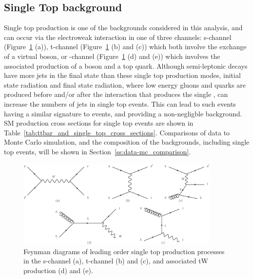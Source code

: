\subsection{Single Top background}
\label{ss:single_top}
Single top production is one of the backgrounds considered in this analysis, and can occur via the electroweak
interaction in one of three channels: s-channel (Figure~\ref{fig:single_top_production} (a)), t-channel
(Figure~\ref{fig:single_top_production} (b) and (c)) which both involve the exchange of a virtual \W boson, or
\tW-channel (Figure~\ref{fig:single_top_production} (d) and (e)) which involves the associated production of a
\W boson and a top quark. Although semi-leptonic \ttbar decays have more jets in the final state than these
single top production modes, initial state radiation and final state radiation, where low energy gluons and
quarks are produced before and/or after the interaction that produces the single \tquark, can increase the
numbers of jets in single top events. This can lead to such events having a similar signature to \ttbar
events, and providing a non-negligble background. SM production cross sections for single top events are shown
in Table~\ref{tab:ttbar_and_single_top_cross_sections}. Comparisons of data to Monte Carlo simulation, and the
composition of the backgrounds, including single top events, will be shown in
Section~\ref{ss:data-mc_comparison}.

\begin{figure}[hbtp]
   \centering
     \includegraphics[width=0.9\textwidth]{Chapters/03_Top_Physics/Images/single_top_production}\hfill
     \caption[Feynman diagrams of leading order single top production processes.]{Feynman diagrams of leading
     order single top production processes in the s-channel (a), t-channel (b) and (c), and associated tW
     production (d) and (e).}
     \label{fig:single_top_production}
\end{figure}

